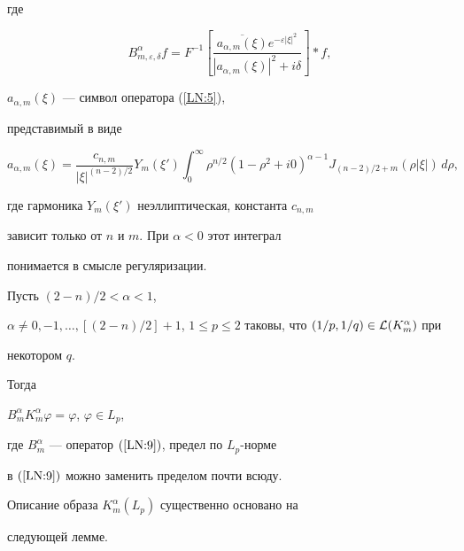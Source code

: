 где


$$


B_{m,\varepsilon,\delta}^\alpha f= F^{-1}\left[


\frac{\overline{a_{\alpha,m}(\xi)} e^{-\varepsilon


|\xi|^2}}{|a_{\alpha,m}(\xi)|^2+i\delta} \right] * f,


$$


$a_{\alpha,m}(\xi)$ --- символ оператора (\ref{LN:5}),


представимый в виде


$$


a_{\alpha,m}(\xi)=\frac{c_{n,m}}{|\xi|^{(n-2)/2}}


Y_m(\xi') \int_0^\infty \rho^{n/2} (1-\rho^2


+i0)^{\alpha-1} J_{(n-2)/2+m} (\rho|\xi|)\,d\rho,


$$


где гармоника $Y_m(\xi')$ неэллиптическая, константа $c_{n,m}$


зависит только от $n$ и $m$. При $\alpha<0$ этот интеграл


понимается в смысле регуляризации.





\begin{thm}


Пусть $(2-n)/2<\alpha<1$,


$\alpha\ne 0,-1,\dotsc,\left[(2-n)/2\right]+1$, $1\leqslant


p\leqslant 2$ таковы, что $(1/p,1/q)\in {\cal L}(K_m^\alpha)$ при


некотором $q$.


Тогда


$B_m^\alpha K_m^\alpha \varphi=\varphi$, $\varphi\in L_p$,


где $B_m^\alpha$ --- оператор $(\ref{LN:9})$, предел по $L_p$-норме


в $(\ref{LN:9})$ можно заменить пределом почти всюду.


\end{thm}





Описание образа $K_m^\alpha(L_p)$ существенно основано на


следующей лемме.





